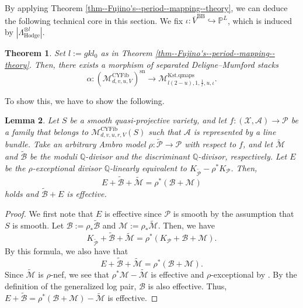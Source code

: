 \documentclass[12pt,twoside]{amsart}
\newtheorem{thm}{Theorem}[section]
\newtheorem{lem}[thm]{Lemma}
\theoremstyle{definition}
\begin{document}
By applying Theorem \ref{thm--Fujino's--period--mapping--theory}, we can deduce the following technical core in this section.
We fix $\iota\colon \overline{V}^{\mathrm{BB}}\hookrightarrow\mathbb{P}^L$, which is induced by $|\Lambda_{\mathrm{Hodge}}^{\otimes l}|$. 

   

\begin{thm}\label{thm--quasi--map--construction--moduli--map}
    Set $l:=gkl_{0}$ as in Theorem \ref{thm--Fujino's--period--mapping--theory}.
    Then, there exists a morphism of separated Deligne--Mumford stacks
    \[
    \alpha\colon(\mathcal{M}_{d,v,u,V}^{\mathrm{CYFib}})^{\mathrm{sn}}\to \mathcal{M}^{\mathrm{Kst.qmaps}}_{l(2-u),1,\frac{1}{l},u,\iota}.
    \]
\end{thm}

To show this, we have to show the following.

\begin{lem}\label{lemma--description--of--base--locus}
     Let $S$ be a smooth quasi-projective variety, and let $f\colon (\mathcal{X},\mathcal{A})\to\mathcal{P}$ be a family that belongs to $\mathcal{M}_{d,v,u,r,V}^{\mathrm{CYFib}}(S)$ such that $\mathcal{A}$ is represented by a line bundle.
    Take an arbitrary Ambro model $\rho\colon\tilde{\mathcal{P}}\to \mathcal{P}$ with respect to $f$, and let $\widetilde{\mathcal{M}}$ and $\widetilde{\mathcal{B}}$ be the moduli $\mathbb{Q}$-divisor and the discriminant $\mathbb{Q}$-divisor, respectively.
    Let $E$ be the $\rho$-exceptional divisor $\mathbb{Q}$-linearly equivalent to $K_{\widetilde{\mathcal{P}}}-\rho^*K_{\mathcal{P}}$. 
    Then, 
    \[
E+\widetilde{\mathcal{B}}+\widetilde{\mathcal{M}}=\rho^*(\mathcal{B}+\mathcal{M})
\]
    holds and $\widetilde{\mathcal{B}}+E$ is effective. 
\end{lem}

\begin{proof}
    We first note that $E$ is effective since $\mathcal{P}$ is smooth by the assumption that $S$ is smooth.
Let $\mathcal{B}:=\rho_*\widetilde{\mathcal{B}}$ and $\mathcal{M}:=\rho_*\widetilde{\mathcal{M}}$. 
Then, we have
\[
K_{\widetilde{\mathcal{P}}}+\widetilde{\mathcal{B}}+\widetilde{\mathcal{M}}=\rho^*(K_{\mathcal{P}}+\mathcal{B}+\mathcal{M}).
\]
By this formula, we also have that 
\[
E+\widetilde{\mathcal{B}}+\widetilde{\mathcal{M}}=\rho^*(\mathcal{B}+\mathcal{M}).
\]
Since $\widetilde{\mathcal{M}}$ is $\rho$-nef, we see that $\rho^*\mathcal{M}-\widetilde{\mathcal{M}}$ is effective and $\rho$-exceptional by \cite[Lemma 3.39]{KM}.
By the definition of the generalized log pair, $\mathcal{B}$ is also effective.
Thus, $E+\widetilde{\mathcal{B}}=\rho^*(\mathcal{B}+\mathcal{M})-\widetilde{\mathcal{M}}$ is effective.
\end{proof}
\end{document}
